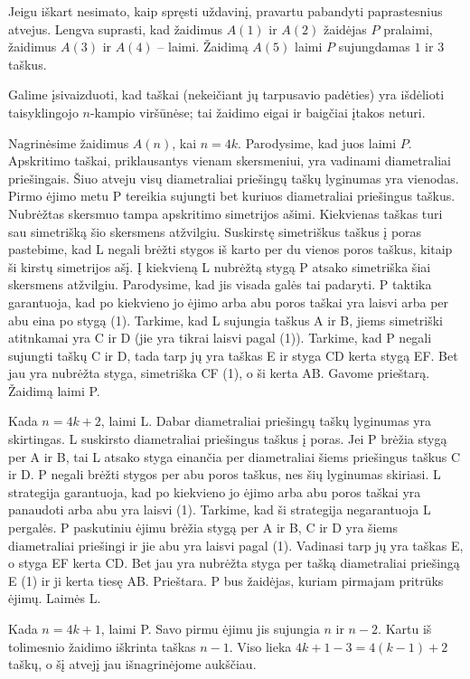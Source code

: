 Jeigu iškart nesimato, kaip spręsti uždavinį, pravartu pabandyti
paprastesnius atvejus. Lengva suprasti, kad žaidimus $A(1)$ ir $A(2)$
žaidėjas $P$ pralaimi, žaidimus $A(3)$ ir $A(4)$ – laimi. Žaidimą $A(5)$
laimi $P$ sujungdamas $1$ ir $3$ taškus. 

Galime įsivaizduoti, kad taškai (nekeičiant jų tarpusavio padėties) yra
išdėlioti taisyklingojo $n$-kampio viršūnėse; tai žaidimo eigai ir baigčiai
įtakos neturi.

Nagrinėsime žaidimus $A(n)$, kai  $n=4k$. Parodysime, kad juos laimi $P$.
Apskritimo taškai, priklausantys vienam skersmeniui, yra vadinami
diametraliai priešingais. Šiuo atveju visų diametraliai priešingų taškų
lyginumas yra vienodas. Pirmo ėjimo metu P tereikia sujungti bet kuriuos
diametraliai priešingus taškus. Nubrėžtas skersmuo tampa apskritimo
simetrijos ašimi. Kiekvienas taškas turi sau simetrišką šio skersmens
atžvilgiu. Suskirstę simetriškus taškus į poras pastebime, kad L negali
brėžti stygos iš karto per du vienos poros taškus, kitaip ši kirstų
simetrijos ašį. Į kiekvieną L nubrėžtą stygą P atsako simetriška šiai
skersmens atžvilgiu. Parodysime, kad jis visada galės tai padaryti. P
taktika garantuoja, kad po kiekvieno jo ėjimo arba abu poros taškai yra
laisvi arba per abu eina po stygą (1). Tarkime, kad L sujungia taškus A ir B, jiems
simetriški atitnkamai yra C ir D (jie yra tikrai laisvi pagal (1)).
Tarkime, kad P negali sujungti taškų C ir D, tada tarp jų yra taškas E ir
styga CD kerta stygą EF. Bet jau yra nubrėžta styga, simetriška CF (1), o ši
kerta AB. Gavome prieštarą. Žaidimą laimi P. 

Kada $n=4k+2$, laimi L. Dabar diametraliai priešingų taškų lyginumas yra
skirtingas. L suskirsto diametraliai priešingus taškus į poras. Jei P
brėžia stygą per A ir B, tai L atsako styga einančia per diametraliai šiems
priešingus taškus C ir D. P negali brėžti stygos per abu poros taškus, nes šių
lyginumas skiriasi. L strategija garantuoja, kad po kiekvieno jo ėjimo arba
abu poros taškai yra panaudoti arba abu yra laisvi (1). Tarkime, kad ši
strategija negarantuoja L pergalės. P paskutiniu ėjimu brėžia stygą per A ir B, C ir D yra šiems diametraliai priešingi ir jie abu
yra laisvi pagal (1). Vadinasi tarp jų yra taškas E, o styga EF kerta CD.
Bet jau yra nubrėžta styga per tašką diametraliai priešingą E (1) ir ji
kerta tiesę AB. Prieštara. P bus žaidėjas, kuriam pirmajam pritrūks ėjimų.
Laimės L.

Kada $n=4k+1$, laimi P. Savo pirmu ėjimu jis sujungia $n$ ir $n-2$. Kartu
iš tolimesnio žaidimo iškrinta taškas $n-1$. Viso lieka $4k+1-3=4(k-1)+2$
taškų, o šį atvejį jau išnagrinėjome aukščiau. 

